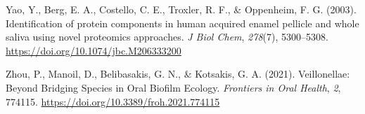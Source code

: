 \documentclass[
]{article}
\newlength{\cslhangindent}
\newlength{\cslentryspacingunit} %
\newenvironment{CSLReferences}[2] %
 {%
  \setlength{\parindent}{0pt}
  \ifodd #1
  \let\oldpar\par
  \def\par{\hangindent=\cslhangindent\oldpar}
  \fi
  \setlength{\parskip}{#2\cslentryspacingunit}
 }%
 {}
\begin{document}
\begin{CSLReferences}{1}{0}
\leavevmode{}%
Yao, Y., Berg, E. A., Costello, C. E., Troxler, R. F., \& Oppenheim, F.
G. (2003). Identification of protein components in human acquired enamel
pellicle and whole saliva using novel proteomics approaches. \emph{J
Biol Chem}, \emph{278}(7), 5300--5308.
\url{https://doi.org/10.1074/jbc.M206333200}

\leavevmode{}%
Zhou, P., Manoil, D., Belibasakis, G. N., \& Kotsakis, G. A. (2021).
Veillonellae: {Beyond Bridging Species} in {Oral Biofilm Ecology}.
\emph{Frontiers in Oral Health}, \emph{2}, 774115.
\url{https://doi.org/10.3389/froh.2021.774115}

\end{CSLReferences}
\end{document}
